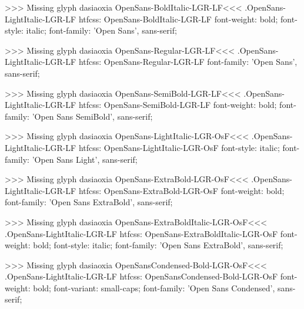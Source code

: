 >>>
Missing glyph	dasiaoxia
\<OpenSans-BoldItalic-LGR-LF\><<<
.OpenSans-LightItalic-LGR-LF
htfcss:  OpenSans-BoldItalic-LGR-LF  font-weight: bold; font-style: italic; font-family: 'Open Sans', sans-serif;

>>>
Missing glyph	dasiaoxia
\<OpenSans-Regular-LGR-LF\><<<
.OpenSans-LightItalic-LGR-LF
htfcss:  OpenSans-Regular-LGR-LF  font-family: 'Open Sans', sans-serif;

>>>
Missing glyph	dasiaoxia
\<OpenSans-SemiBold-LGR-LF\><<<
.OpenSans-LightItalic-LGR-LF
htfcss:  OpenSans-SemiBold-LGR-LF  font-weight: bold; font-family: 'Open Sans SemiBold', sans-serif;

>>>
Missing glyph	dasiaoxia
\<OpenSans-LightItalic-LGR-OsF\><<<
.OpenSans-LightItalic-LGR-LF
htfcss:  OpenSans-LightItalic-LGR-OsF  font-style: italic; font-family: 'Open Sans Light', sans-serif;

>>>
Missing glyph	dasiaoxia
\<OpenSans-ExtraBold-LGR-OsF\><<<
.OpenSans-LightItalic-LGR-LF
htfcss:  OpenSans-ExtraBold-LGR-OsF  font-weight: bold; font-family: 'Open Sans ExtraBold', sans-serif;

>>>
Missing glyph	dasiaoxia
\<OpenSans-ExtraBoldItalic-LGR-OsF\><<<
.OpenSans-LightItalic-LGR-LF
htfcss:  OpenSans-ExtraBoldItalic-LGR-OsF  font-weight: bold; font-style: italic; font-family: 'Open Sans ExtraBold', sans-serif;

>>>
Missing glyph	dasiaoxia
\<OpenSansCondensed-Bold-LGR-OsF\><<<
.OpenSans-LightItalic-LGR-LF
htfcss:  OpenSansCondensed-Bold-LGR-OsF  font-weight: bold; font-variant: small-caps; font-family: 'Open Sans Condensed', sans-serif;

